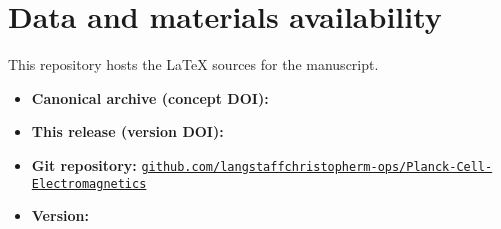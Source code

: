 \section*{Data and materials availability}
This repository hosts the \LaTeX{} sources for the manuscript.

\begin{itemize}
  \item \textbf{Canonical archive (concept DOI):}
  \href{https://doi.org/\RepoConceptDOI}{\RepoConceptDOI}

  \item \textbf{This release (version DOI):}
  \href{https://doi.org/\PaperDOI}{\PaperDOI}

  \item \textbf{Git repository:}
  \href{\RepoGitHubURL}{\texttt{github.com/langstaffchristopherm-ops/Planck-Cell-Electromagnetics}}

  \item \textbf{Version:} \PaperVersion
\end{itemize}